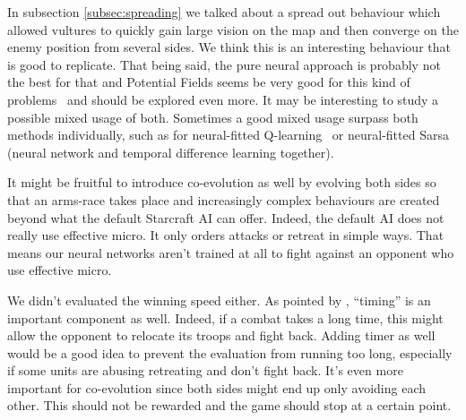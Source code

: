 In subsection \ref{subsec:spreading} we talked about a spread out
behaviour which allowed vultures to quickly gain large vision on the
map and then converge on the enemy position from several sides. We
think this is an interesting behaviour that is good to replicate. That
being said, the pure neural approach is probably not the best for that
and Potential Fields seems be very good for this kind of
problems~\cite{Hagelback08RTSPotentialFields,
  Svendsen12SCPotentialFieldsGP} and should be explored even more. It
may be interesting to study a possible mixed usage of both.  Sometimes
a good mixed usage surpass both methods individually, such as for
neural-fitted Q-learning~\cite{Riedmiller05NeuralFittedQ} or
neural-fitted Sarsa~\cite{Shantia11ConnectionistSC} (neural network
and temporal difference learning together).

It might be fruitful to introduce co-evolution as well by evolving
both sides so that an arms-race takes place and increasingly complex
behaviours are created beyond what the default Starcraft AI can offer.
Indeed, the default AI does not really use effective micro. It only
orders attacks or retreat in simple ways. That means our neural
networks aren't trained at all to fight against an opponent who use
effective micro.

We didn't evaluated the winning speed either. As pointed by
\citet{Liu14EffectiveMicro}, ``timing'' is an important component as
well. Indeed, if a combat takes a long time, this might allow the
opponent to relocate its troops and fight back.  Adding timer as well
would be a good idea to prevent the evaluation from running too long,
especially if some units are abusing retreating and don't
fight back. It's even more important for co-evolution since both sides
might end up only avoiding each other.  This should not be rewarded
and the game should stop at a certain point.
